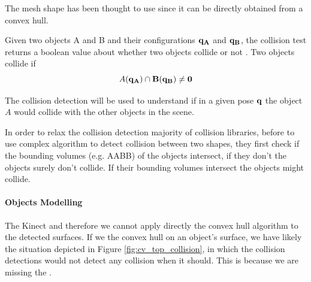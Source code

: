 The mesh shape has been thought to use since it can be directly obtained from a convex hull. 

Given two objects A and B and their configurations $\bf{q_A}$ and $\bf{q_B}$, the collision test returns a boolean value about whether two objects collide or not \citep{pan2012fcl}. Two objects collide if
\[
A(\bf{q_A}) \cap B(\bf{q_B}) \neq 0
\]

The collision detection will be used to understand if in a given pose $\bf{q}$ the object $A$ would collide with the other objects in the scene.

In order to relax the collision detection majority of collision libraries, before to use complex algorithm to detect collision between two shapes, they first check if the bounding volumes (e.g. AABB) of the objects intersect, if they don't the objects surely don't collide. If their bounding volumes intersect the objects might collide.

\paragraph{Objects Modelling}
The Kinect and therefore we cannot apply directly the convex hull algorithm to the detected surfaces. If we  the convex hull on an object's  surface, we  have likely the situation depicted in Figure \ref{fig:cv_top_collision}, in which the collision detections would not detect any collision when it should. This is because we are  missing the .

